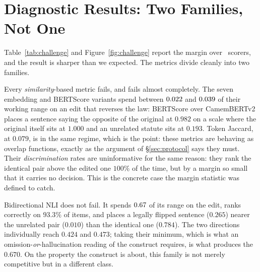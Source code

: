 \documentclass[11pt]{article}
\begin{document}
\begin{table}[t]\centering\small

\caption{Williams tests against the trivial length baseline
$\ell = -|\,|s|-|o|\,|$, which reaches $r=0.613$ with the human label $h$ over
all $297$ items. $r(m,\ell)$ is each metric's correlation with the length
feature itself, the dependence the test corrects for. Positive $t$ favours
$\ell$.}
\label{tab:significance}
\end{table}

\section{Diagnostic Results: Two Families, Not One}
\label{sec:results}

Table~\ref{tab:challenge} and Figure~\ref{fig:challenge} report the margin over
\nMetricsChallenged\ scorers, and the result is sharper than we expected. The
metrics divide cleanly into two families.

Every \emph{similarity}-based metric fails, and fails almost completely. The
seven embedding and BERTScore variants spend between $0.022$ and
$0.039$ of their working range on an edit that reverses the law: BERTScore
over CamemBERTv2 places a sentence saying the opposite of the original at
$0.982$ on a scale where the original itself sits at $1.000$ and an unrelated
statute sits at $0.193$. Token Jaccard, at $0.079$, is in the same regime, which
is the point: these metrics are behaving as overlap functions, exactly as the
argument of \S\ref{sec:protocol} says they must. Their \emph{discrimination}
rates are uninformative for the same reason: they rank the identical pair above
the edited one $100\%$ of the time, but by a margin so small that it carries no
decision. This is the concrete case the margin statistic was defined to catch.

Bidirectional NLI does not fail. It spends $0.67$ of its range on the
edit, ranks correctly on $93.3\%$ of items, and places a legally flipped
sentence ($0.265$) nearer the unrelated pair ($0.010$) than the identical one
($0.784$). The two directions individually reach $0.424$ and $0.473$; taking
their minimum, which is what an omission-\emph{or}-hallucination reading of the
construct requires, is what produces the $0.670$. On the property the construct
is about, this family is not merely competitive but in a different class.
\end{document}
